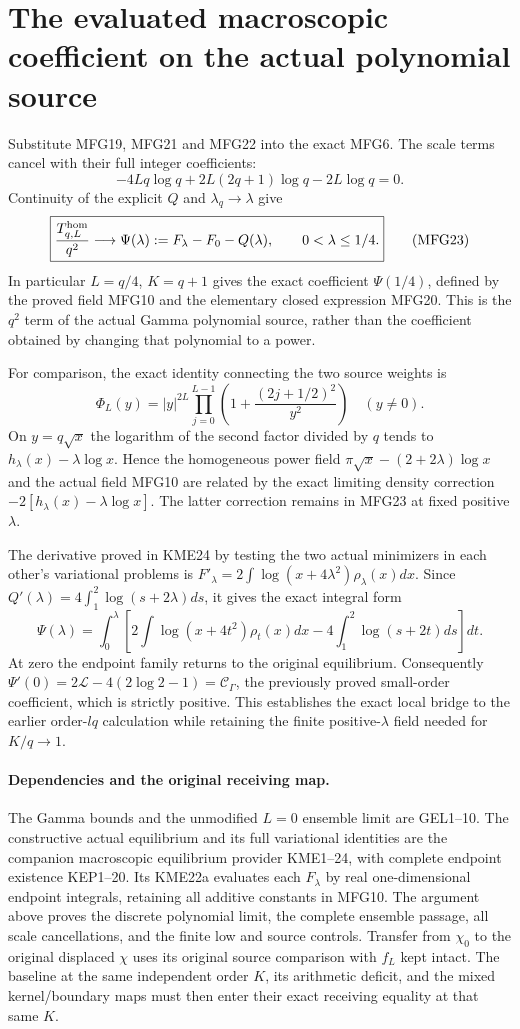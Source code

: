\documentclass[11pt,a4paper]{article}
\begin{document}
\section{The evaluated macroscopic coefficient on the actual polynomial source}

Substitute MFG19, MFG21 and MFG22 into the exact MFG6. The scale
terms cancel with their full integer coefficients:
\[
 -4Lq\log q+2L(2q+1)\log q-2L\log q=0.
\]
Continuity of the explicit $Q$ and $\lambda_q\to\lambda$ give
\[
 \boxed{\frac{T_{q,L}^{\rm hom}}{q^2}\longrightarrow
 \Psi(\lambda):=F_\lambda-F_0-Q(\lambda),
 \qquad 0<\lambda\le1/4.}
 \tag{MFG23}
\]
In particular $L=q/4$, $K=q+1$ gives the exact coefficient
$\Psi(1/4)$, defined by the proved field MFG10 and the elementary
closed expression MFG20. This is the $q^2$ term of the actual Gamma
polynomial source, rather than the coefficient obtained by changing
that polynomial to a power.

For comparison, the exact identity connecting the two source weights is
\[
 \Phi_L(y)=|y|^{2L}
             \prod_{j=0}^{L-1}\left(1+\frac{(2j+1/2)^2}{y^2}\right)
 \quad(y\ne0).
 \tag{MFG24}
\]
On $y=q\sqrt x$ the logarithm of the second factor divided by $q$
tends to $h_\lambda(x)-\lambda\log x$. Hence the homogeneous power
field $\pi\sqrt x-(2+2\lambda)\log x$ and the actual field MFG10
are related by the exact limiting density correction
$-2[h_\lambda(x)-\lambda\log x]$. The latter correction remains
in MFG23 at fixed positive $\lambda$.

The derivative proved in KME24 by testing the two actual minimizers
in each other's variational problems is
$F'_\lambda=2\int\log(x+4\lambda^2)\rho_\lambda(x)dx$.
Since $Q'(\lambda)=4\int_1^2\log(s+2\lambda)ds$, it gives the exact
integral form
\[
 \Psi(\lambda)=\int_0^\lambda\left[
 2\int\log(x+4t^2)\rho_t(x)dx
                   -4\int_1^2\log(s+2t)ds\right]dt.
 \tag{MFG25}
\]
At zero the endpoint family returns to the original equilibrium.
Consequently $\Psi'(0)=2\mathcal L-4(2\log2-1)=\mathcal C_\Gamma$,
the previously proved small-order coefficient, which is strictly
positive. This establishes the exact local bridge to the earlier
order-$lq$ calculation while retaining the finite positive-$\lambda$
field needed for $K/q\to1$.

\paragraph{Dependencies and the original receiving map.}
The Gamma bounds and the unmodified $L=0$ ensemble limit are GEL1--10.
The constructive actual equilibrium and its full variational identities
are the companion macroscopic equilibrium provider KME1--24, with
complete endpoint existence KEP1--20. Its KME22a evaluates each
$F_\lambda$ by real one-dimensional endpoint integrals, retaining all
additive constants in MFG10. The argument above proves the discrete polynomial
limit, the complete ensemble passage, all scale cancellations, and the
finite low and source controls. Transfer from $\chi_0$ to the original
displaced $\chi$ uses its original source comparison with $f_L$ kept
intact. The baseline at the same independent order $K$, its arithmetic
deficit, and the mixed kernel/boundary maps must then enter their exact
receiving equality at that same $K$.
\end{document}
